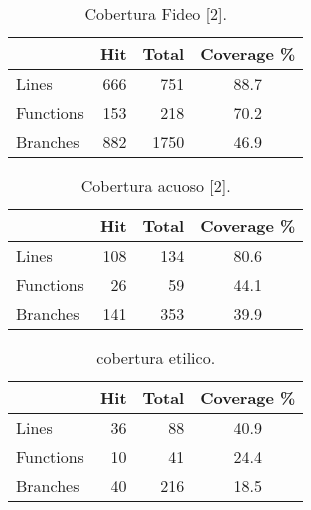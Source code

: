 \begin{table}[!htf]
    \begin{center}
    \begin{tabular}{|l|r|r|c|}
        \hline
        & \textbf{Hit} & \textbf{Total} & \textbf{Coverage \%} \\
        \hline
        Lines & 666 & 751 & 88.7 \\
        \hline
        Functions & 153 & 218 & 70.2 \\
        \hline
        Branches & 882 & 1750 & 46.9 \\
        \hline            
    \end{tabular}
    \caption{Cobertura Fideo [2].}
    \label{coberturaFideo}
    \end{center}
\end{table}

\begin{table}[!htf]
    \begin{center}
    \begin{tabular}{|l|r|r|c|}
        \hline
        & \textbf{Hit} & \textbf{Total} & \textbf{Coverage \%} \\
        \hline
        Lines & 108 & 134 & 80.6 \\
        \hline
        Functions & 26 & 59 & 44.1 \\
        \hline
        Branches & 141 & 353 & 39.9 \\
        \hline            
    \end{tabular}
    \caption{Cobertura acuoso [2].}
    \label{coberturaAcuoso}
    \end{center}
\end{table}

\begin{table}[!htf]
    \begin{center}
    \begin{tabular}{|l|r|r|c|}
        \hline
        & \textbf{Hit} & \textbf{Total} & \textbf{Coverage \%} \\
        \hline
        Lines & 36 & 88 & 40.9 \\
        \hline
        Functions & 10 & 41 & 24.4 \\
        \hline
        Branches & 40 & 216 & 18.5 \\
        \hline            
    \end{tabular}
    \caption{cobertura etilico.}
    \label{coberturaEtilico}
    \end{center}
\end{table}